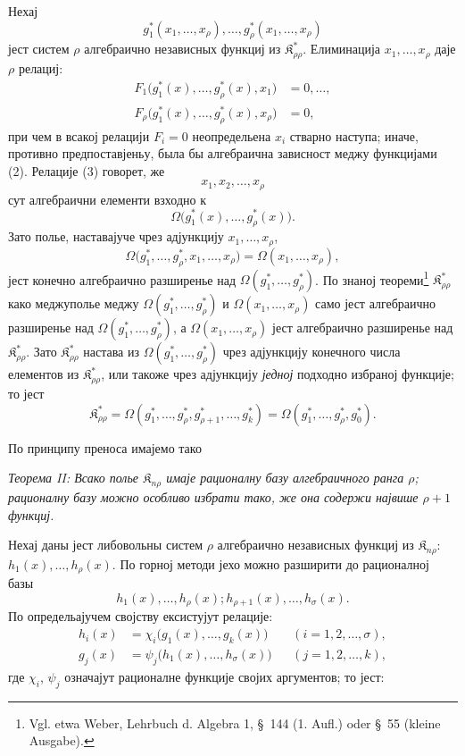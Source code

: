 ﻿\documentclass[11pt]{article}
\providecommand{\Kfield}{\mathfrak{K}}
\begin{document}
Нехај
\begin{equation}
  g_1^*(x_1,\ldots,x_\rho),\ldots,
  g_\rho^*(x_1,\ldots,x_\rho)
\tag{2}
\end{equation}
јест систем $\rho$ алгебраично независных функциј из $\Kfield^*_{\rho\rho}$. Елиминација $x_1,\ldots,x_\rho$ даје $\rho$ релациј:
\begin{equation}
\begin{aligned}
  F_1\bigl(g_1^*(x),\ldots,g_\rho^*(x),x_1\bigr)&=0,\ldots,\\
  F_\rho\bigl(g_1^*(x),\ldots,g_\rho^*(x),x_\rho\bigr)&=0,
\end{aligned}
\tag{3}
\end{equation}
при чем в всакој релацији $F_i=0$ неопредельена $x_i$ стварно наступа; иначе, противно предпоставјеньу, была бы алгебраична зависност меджу функцијами (2). Релације (3) говорет, же
\[
  x_1,x_2,\ldots,x_\rho
\]
сут алгебраични елементи взходно к
\[
  \Omega\bigl(g_1^*(x),\ldots,g_\rho^*(x)\bigr).
\]
Зато полье, наставајуче чрез адјункцију $x_1,\ldots,x_\rho$,
\[
  \Omega\bigl(g_1^*,\ldots,g_\rho^*,x_1,
  \ldots,x_\rho\bigr)=\Omega(x_1,\ldots,x_\rho),
\]
јест конечно алгебраично разширенье над $\Omega(g_1^*,\ldots,g_\rho^*)$. По знаној теореми\footnote{Vgl. etwa Weber, Lehrbuch d. Algebra 1, \S\ 144 (1. Aufl.) oder \S\ 55 (kleine Ausgabe).} $\Kfield^*_{\rho\rho}$ како меджуполье меджу $\Omega(g_1^*,\ldots,g_\rho^*)$ и $\Omega(x_1,
\ldots,x_\rho)$ само јест алгебраично разширенье над $\Omega(g_1^*,\ldots,g_\rho^*)$, а $\Omega(x_1,
\ldots,x_\rho)$ јест алгебраично разширенье над $\Kfield^*_{\rho\rho}$. Зато $\Kfield^*_{\rho\rho}$ настава из $\Omega(g_1^*,\ldots,g_\rho^*)$ чрез адјункцију конечного числа елементов из $\Kfield^*_{\rho\rho}$, или такоже чрез адјункцију {\itshape једној} подходно избраној функције; то јест
\[
  \Kfield^*_{\rho\rho}
  =\Omega(g_1^*,\ldots,g_\rho^*,g_{\rho+1}^*,\ldots,g_k^*)
  =\Omega(g_1^*,\ldots,g_\rho^*,g_0^*).
\]

По принципу преноса имајемо тако

{\itshape Теорема II: Всако полье $\Kfield_{n\rho}$ имаје рационалну базу алгебраичного ранга $\rho$; рационалну базу можно особливо избрати тако, же она содержи највише $\rho+1$ функциј.}

Нехај даны јест либовольны систем $\rho$ алгебраично независных функциј из $\Kfield_{n\rho}$:
$h_1(x),\ldots,h_\rho(x)$. По горној методи јехо можно разширити до рационалној базы
\[
  h_1(x),\ldots,h_\rho(x);
  h_{\rho+1}(x),\ldots,h_\sigma(x).
\]
По определьајучем својству ексистујут релације:
\[
\begin{aligned}
  h_i(x)&=\chi_i\bigl(g_1(x),\ldots,g_k(x)\bigr)
    &&(i=1,2,\ldots,\sigma),\\
  g_j(x)&=\psi_j\bigl(h_1(x),\ldots,h_\sigma(x)\bigr)
    &&(j=1,2,\ldots,k),
\end{aligned}
\]
где $\chi_i$, $\psi_j$ означајут рационалне функције својих аргументов; то јест:
\end{document}
